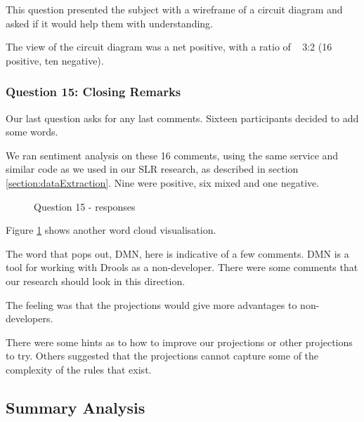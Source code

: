 This question presented the subject with a wireframe of a circuit diagram and asked if it would help them with understanding.

The view of the circuit diagram was a net positive, with a ratio of ~ 3:2 (16 positive, ten negative).

\subsubsection{Question 15: Closing Remarks}

Our last question asks for any last comments.
Sixteen participants decided to add some words.

We ran sentiment analysis on these 16 comments, using the same service and similar code as we used in our SLR research, as described in section \ref{section:dataExtraction}.
Nine were positive, six mixed and one negative.

\begin{figure}
    \centering
    \caption{Question 15 - responses}
    \label{fig:Q15_wordcloud}
\end{figure}

Figure \ref{fig:Q15_wordcloud} shows another word cloud visualisation.

The word that pops out, DMN, here is indicative of a few comments.
DMN is a tool for working with Drools as a non-developer.
There were some comments that our research should look in this direction.

The feeling was that the projections would give more advantages to non-developers.

There were some hints as to how to improve our projections or other projections to try.
Others suggested that the projections cannot capture some of the complexity of the rules that exist.

\subsection{Summary Analysis}

